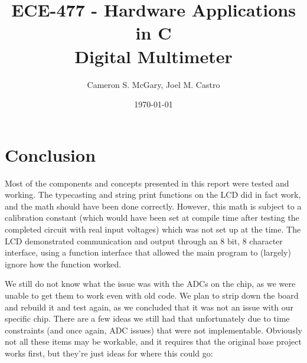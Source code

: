 \documentclass[11pt]{article}	%
\title{ECE-477 - Hardware Applications in C\\Digital Multimeter} %
\author{Cameron S. McGary, Joel M. Castro}
\date{\today} 			%
\begin{document}
\maketitle 			%


\thispagestyle{empty} 		%
\clearpage			%

\tableofcontents
\thispagestyle{empty} 		%
\setcounter{page}{0} 		%


\newpage			%

\clearpage

\clearpage

\clearpage

\clearpage
\section{Conclusion}

Most of the components and concepts presented in this report were tested and working. The typecasting and string print functions on the LCD did in fact work, and the math should have been done correctly. However, this math is subject to a calibration constant (which would have been set at compile time after testing the completed circuit with real input voltages) which was not set up at the time. The LCD demonstrated communication and output through an 8 bit, 8 character interface, using a function interface that allowed the main program to (largely) ignore how the function worked.

We still do not know what the issue was with the ADCs on the chip, as we were unable to get them to work even with old code. We plan to strip down the board and rebuild it and test again, as we concluded that it was not an issue with our specific chip. There are a few ideas we still had that unfortunately due to time constraints (and once again, ADC issues) that were not implementable.
Obviously not all these items may be workable, and it requires that the original base project works first, but they're just ideas for where this could go:
\end{document}
